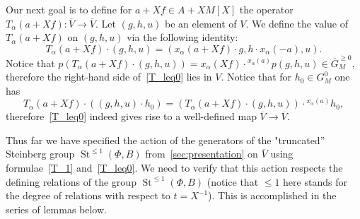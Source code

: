 \documentclass[oneside, 8pt]{amsart}
\theoremstyle{remark}
\theoremstyle{definition}
\numberwithin{lemma}{section}
\numberwithin{prop}{section}
\numberwithin{corollary}{section}
\numberwithin{externaltheorem}{section}
\DeclareMathOperator{\St}{St}
\numberwithin{equation}{section}
\begin{document}
Our next goal is to define for $a + Xf \in A + XM[X]$ the operator $T_\alpha(a + Xf) \colon \overline{V} \to \overline{V}$.
Let $(g, h, u)$ be an element of $V$. We define the value of $T_\alpha(a + Xf)$ on $(g, h, u)$ via the following identity:
\begin{equation} \label{T_leq0} T_\alpha(a + Xf) \cdot (g, h, u) = (x_\alpha(a + Xf) \cdot g, h \cdot x_{\alpha}(-a), u).  \end{equation}
Notice that $p(T_\alpha(a + Xf) \cdot (g, h, u)) = x_\alpha(Xf) \cdot {}^{x_\alpha(a)}p(g, h, u) \in \overline{G}_M^{\geq 0},$ therefore
 the right-hand side of~\eqref{T_leq0} lies in $V$. Notice that for $h_0 \in G^0_M$ one has
\[T_\alpha(a + Xf) \cdot ((g, h, u) \cdot h_0) = (T_\alpha(a + Xf) \cdot (g, h, u)) \cdot {}^{x_{\alpha}(a)}\!h_0,\]  
therefore~\eqref{T_leq0} indeed gives rise to a well-defined map $\overline{V} \to \overline{V}$.

Thus far we have specified the action of the generators of the "truncated'' Steinberg group $\St^{\leq 1}(\Phi, B)$ from~\cref{sec:presentation} on $\overline{V}$ using formulae~\eqref{T_1} and~\eqref{T_leq0}. We need to verify that this action respects the defining relations of the group $\St^{\leq 1}(\Phi, B)$ (notice that $\leq 1$ here stands for the degree of relations with respect to $t = X^{-1}$). This is accomplished in the series of lemmas below.
\end{document}
